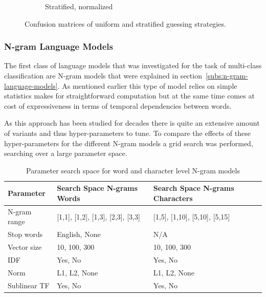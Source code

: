 \begin{figure}[h]
\begin{subfigure}[b]{0.48\textwidth}
        \caption{Stratified, normalized}
        \label{fig:exp-vector-space-conf-matrix-guessing-stratified-normalized}
    \end{subfigure}
    \caption{Confusion matrices of uniform and stratified guessing strategies. }
  \label{fig:exp-vector-space-conf-matrix-guessing}
\end{figure}

\subsubsection{N-gram Language Models}

The first class of language models that was investigated for the task of multi-class classification are N-gram models that were explained in section~\ref{subs:n-gram-language-models}. As mentioned earlier this type of model relies on simple statistics makes for straightforward computation but at the same time comes at cost of expressiveness in terms of temporal dependencies between words.

As this approach has been studied for decades  there is quite an extensive amount of variants and thus hyper-parameters to tune. To compare the effects of these hyper-parameters for the different N-gram models a grid search was performed, searching over a large parameter space.

\begin{center}
  \begin{table}[h]
  \begin{tabular}{ l l l}
    \hline
    Parameter & Search Space N-grams Words & Search Space N-grams Characters \\
    \hline
    N-gram range & [1,1], [1,2], [1,3], [2,3], [3,3] & [1,5], [1,10], [5,10], [5,15] \\
    Stop words & English, None & N/A \\
    Vector size & 10, 100, 300 & 10, 100, 300 \\
    IDF & Yes, No & Yes, No \\
    Norm & L1, L2, None & L1, L2, None \\
    Sublinear TF & Yes, No & Yes, No \\
    \hline
  \end{tabular}
  \caption{Parameter search space for word and character level N-gram models}
\label{table:name}
  \end{table}
\end{center}



